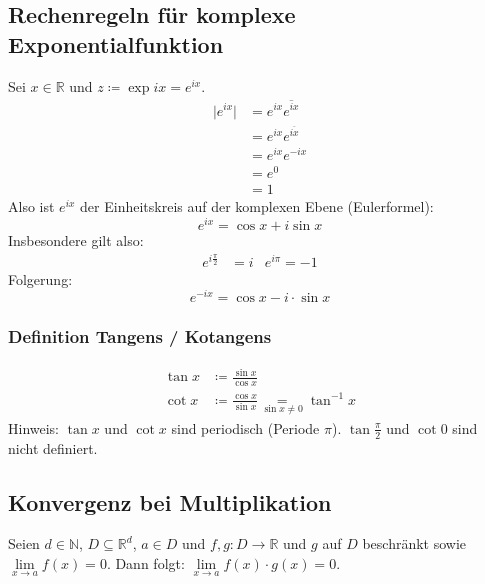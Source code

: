 \documentclass[halfparscip]{scrartcl}
\newcounter{subsection2}
\begin{document}
\subsection*{Rechenregeln für komplexe Exponentialfunktion}
Sei $x \in \mathbb{R}$ und $z \coloneqq \exp ix = e^{ix}$.
\begin{align*}
	\vert e^{ix}\vert & = e^{ix}\overline{e^{ix}} \\
	                  & = e^{ix}e^{\overline{ix}} \\
	                  & = e^{ix}e^{-ix}           \\
	                  & = e^0                     \\
	                  & = 1
\end{align*}
Also ist $e^{ix}$ der Einheitskreis auf der komplexen Ebene (Eulerformel):
\begin{equation*}
	e^{ix} = \cos x + i \sin x
\end{equation*}
Insbesondere gilt also:
\begin{align*}
	e^{i\frac{\pi}{2}} &= i & e^{i\pi} = -1
\end{align*}
Folgerung:
\begin{equation*}
	e^{-ix} = \cos x - i \cdot \sin x
\end{equation*}

\subsubsection*{Definition Tangens / Kotangens}
\begin{align*}
	\tan x & \coloneqq \frac{\sin x}{\cos x}                                         \\
	\cot x & \coloneqq \frac{\cos x}{\sin x} \underset{\sin x \neq 0}{=} \tan^{-1} x
\end{align*}
Hinweis: $\tan x$ und $\cot x$ sind periodisch (Periode $\pi$). $\tan \frac{\pi}{2}$ und $\cot 0$ sind nicht definiert.

\subsection{Konvergenz bei Multiplikation}
Seien $d \in \mathbb{N}$, $D \subseteq \mathbb{R}^d$, $a \in D$ und $f,g : D \rightarrow \mathbb{R}$ und $g$ auf $D$ beschränkt sowie \mbox{$\lim\limits_{x \rightarrow a} f(x) = 0$}.
Dann folgt: $\lim\limits_{x \rightarrow a} f(x) \cdot g(x) = 0$.
\end{document}
